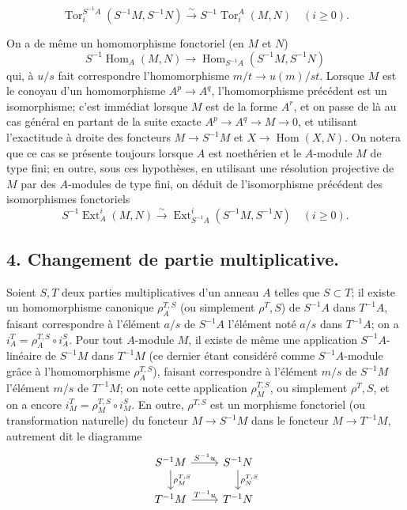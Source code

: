 
$$ \operatorname{Tor}_i^{S^{-1}A}(S^{-1}M, S^{-1}N) \xrightarrow{\sim} S^{-1}\operatorname{Tor}_i^A(M, N) \quad (i \geq 0). $$

On a de même un homomorphisme fonctoriel (en $M$ et $N$)
$$ S^{-1}\operatorname{Hom}_A(M, N) \to \operatorname{Hom}_{S^{-1}A}(S^{-1}M, S^{-1}N) $$
qui, à $u/s$ fait correspondre l'homomorphisme $m/t \to u(m)/st$. Lorsque $M$ est le conoyau d'un homomorphisme $A^p \to A^q$, l'homomorphisme précédent est un isomorphisme; c'est immédiat lorsque $M$ est de la forme $A^r$, et on passe de là au cas général en partant de la suite exacte $A^p \to A^q \to M \to 0$, et utilisant l'exactitude à droite des foncteurs $M \to S^{-1}M$ et $X \to \operatorname{Hom}(X, N)$. On notera que ce cas se présente toujours lorsque $A$ est noethérien et le $A$-module $M$ de type fini; en outre, sous ces hypothèses, en utilisant une résolution projective de $M$ par des $A$-modules de type fini, on déduit de l'isomorphisme précédent des isomorphismes fonctoriels
$$ S^{-1}\operatorname{Ext}^i_A(M, N) \xrightarrow{\sim} \operatorname{Ext}^i_{S^{-1}A}(S^{-1}M, S^{-1}N) \quad (i \geq 0). $$

\subsection*{4. Changement de partie multiplicative.}

Soient $S, T$ deux parties multiplicatives d'un anneau $A$ telles que $S \subset T$; il existe un homomorphisme canonique $\rho_A^{T,S}$ (ou simplement $\rho^T,S$) de $S^{-1}A$ dans $T^{-1}A$, faisant correspondre à l'élément $a/s$ de $S^{-1}A$ l'élément noté $a/s$ dans $T^{-1}A$; on a $i_A^T = \rho_A^{T,S} \circ i_A^S$. Pour tout $A$-module $M$, il existe de même une application $S^{-1}A$-linéaire de $S^{-1}M$ dans $T^{-1}M$ (ce dernier étant considéré comme $S^{-1}A$-module grâce à l'homomorphisme $\rho_A^{T,S}$), faisant correspondre à l'élément $m/s$ de $S^{-1}M$ l'élément $m/s$ de $T^{-1}M$; on note cette application $\rho_M^{T,S}$, ou simplement $\rho^T,S$, et on a encore $i_M^T = \rho_M^{T,S} \circ i_M^S$. En outre, $\rho^{T,S}$ est un morphisme fonctoriel (ou transformation naturelle) du foncteur $M \to S^{-1}M$ dans le foncteur $M \to T^{-1}M$, autrement dit le diagramme
$$ \begin{tikzcd} S^{-1}M \arrow[r, "S^{-1}u"] \arrow[d, "\rho_M^{T,S}"] & S^{-1}N \arrow[d, "\rho_N^{T,S}"] \\ T^{-1}M \arrow[r, "T^{-1}u"] & T^{-1}N \end{tikzcd} $$


